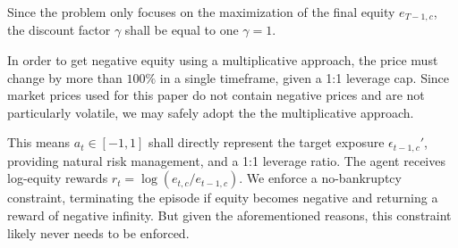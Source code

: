 Since the problem only focuses on the maximization of the final equity $e_{T-1,c}$, the discount factor $\gamma$ shall be equal to one $\gamma=1$.

In order to get negative equity using a multiplicative approach, the price must change by more than $100\%$ in a single timeframe, given a 1:1 leverage cap. Since market prices used for this paper do not contain negative prices and are not particularly volatile, we may safely adopt the the multiplicative approach.

This means $a_t\in[-1,1]$ shall directly represent the target exposure $\epsilon_{t-1,c}'$, providing natural risk management, and a 1:1 leverage ratio. The agent receives log-equity rewards $r_t = \log(e_{t,c}/e_{t-1,c})$. We enforce a no-bankruptcy constraint, terminating the episode if equity becomes negative and returning a reward of negative infinity. But given the aforementioned reasons, this constraint likely never needs to be enforced.